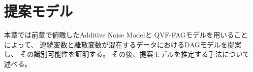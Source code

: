 
\section{提案モデル}
\label{part:proposal}

本章では前章で俯瞰したAdditive Noise Model\cite{Park2020-ey}と
QVF-FAGモデル\cite{Park2017-hw}を用いることによって、
連続変数と離散変数が混在するデータにおけるDAGモデルを提案し、
その識別可能性を証明する。
その後、提案モデルを推定する手法について述べる。

%

%

